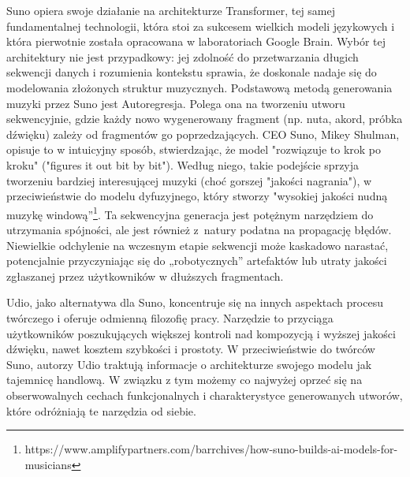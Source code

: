 Suno opiera swoje działanie na architekturze Transformer, tej samej fundamentalnej technologii, która stoi za sukcesem wielkich modeli językowych i która pierwotnie została opracowana w laboratoriach Google Brain. Wybór tej architektury nie jest przypadkowy: jej zdolność do przetwarzania długich sekwencji danych i rozumienia kontekstu sprawia, że doskonale nadaje się do modelowania złożonych struktur muzycznych. Podstawową metodą generowania muzyki przez Suno jest Autoregresja. Polega ona na tworzeniu utworu sekwencyjnie, gdzie każdy nowo wygenerowany fragment (np. nuta, akord, próbka dźwięku) zależy od fragmentów go poprzedzających. CEO Suno, Mikey Shulman, opisuje to w intuicyjny sposób, stwierdzając, że model "rozwiązuje to krok po kroku" ("figures it out bit by bit"). Według niego, takie podejście sprzyja tworzeniu bardziej interesującej muzyki (choć gorszej "jakości nagrania"), w przeciwieństwie do modelu dyfuzyjnego, który stworzy "wysokiej jakości nudną muzykę windową”\footnote{https://www.amplifypartners.com/barrchives/how-suno-builds-ai-models-for-musicians}. Ta sekwencyjna generacja jest potężnym narzędziem do utrzymania spójności, ale jest również z~natury podatna na propagację błędów. Niewielkie odchylenie na wczesnym etapie sekwencji może kaskadowo narastać, potencjalnie przyczyniając się do „robotycznych” artefaktów lub utraty jakości zgłaszanej przez użytkowników w dłuższych fragmentach.


Udio, jako alternatywa dla Suno, koncentruje się na innych aspektach procesu twórczego i oferuje odmienną filozofię pracy. Narzędzie to przyciąga użytkowników poszukujących większej kontroli nad kompozycją i wyższej jakości dźwięku, nawet kosztem szybkości i prostoty. W przeciwieństwie do twórców Suno, autorzy Udio traktują informacje o architekturze swojego modelu jak tajemnicę handlową. W związku z tym możemy co najwyżej oprzeć się na obserwowalnych cechach funkcjonalnych i charakterystyce generowanych utworów, które odróżniają te narzędzia od siebie.

